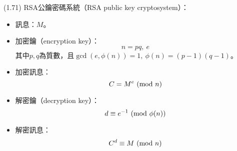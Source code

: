 \item \begin{theorem}{(1.71)} RSA公鑰密碼系統（RSA public key cryptosystem）：\begin{itemize}
        \item 訊息：$M$。
        \item 加密鑰（encryption key）：\begin{equation}
            n = pq, \ e
        \end{equation}
        其中$p, q$為質數，且$\gcd(e, \phi(n)) = 1, \ \phi(n) = (p - 1)(q - 1)$。
        \item 加密訊息：\begin{equation}
            C = M^e \ (\mathrm{mod}\ n)
        \end{equation}
        \item 解密鑰（decryption key）：\begin{equation}
            d \equiv e^{-1} \ (\mathrm{mod}\ \phi(n))
        \end{equation}
        \item 解密訊息：\begin{equation}
            C^d \equiv M \ (\mathrm{mod}\ n)
        \end{equation}
    \end{itemize}
\end{theorem}
